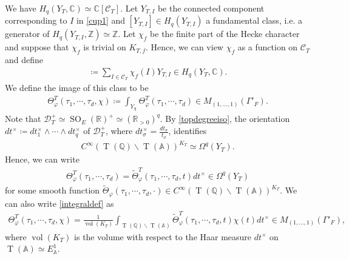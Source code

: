 \documentclass[11pt]{article} %
\newcommand{\8}{\infty}
\newcommand{\Z}{\mathbb{Z}}
\newcommand{\Tbf}{\operatorname{T}}
\newcommand{\SO}{\operatorname{SO}}
\newcommand{\D}{\mathcal{D}}
\newcommand{\R}{\mathbb{R}}
\newcommand{\A}{\mathbb{A}}
\newcommand{\Q}{\mathbb{Q}}
\newcommand{\C}{\mathbb{C}}
\newcommand{\vol}{\operatorname{vol}}
\newcommand{\Ccal}{\mathcal{C}}
\newcommand{\fin}{f}
\newcommand{\thetil}{\widetilde{\Theta}}
\theoremstyle{mytheoremstyle}
\theoremstyle{remark}
\numberwithin{equation}{section}
\begin{document}
We have $H_{q}(Y_T,\C)\simeq \C[\Ccal_T]$. Let $Y_{T,I}$ be the connected component corresponding to $I$ in \eqref{cup1} and $[Y_{T,I}] \in H_{q}(Y_{T,I})$ a fundamental class, {i.e.} a generator of $H_{q}(Y_{T,I},\Z) \simeq \Z$. Let $\chi_\fin$ be the finite part of the Hecke character and suppose that $\chi_\fin$ is trivial on $K_{T,\fin}$. Hence, we can view $\chi_\fin$ as a function on $\Ccal_T$ and define
\begin{align}
    [Y_\chi] \coloneqq \sum_{I \in \Ccal_T} \chi_\fin(I)Y_{T,I} \in H_{q}(Y_T,\C).
\end{align}
We define the image of this class to be
\begin{align} \label{integraldef}
    \Theta^T_{\varphi}(\tau_1, \cdots, \tau_{d},\chi) \coloneqq \int_{Y_\chi} \Theta^T_{\varphi}(\tau_1, \cdots, \tau_{d}) \in M_{(1,\dots,1)}( \Gamma'_F).
\end{align}
 Note that $\D_T^+ \simeq \SO_E(\R)^+ \simeq (\R_{>0})^{q}$. By \eqref{topdegreeiso}, the orientation $dt^\times \coloneqq dt_1^\times \wedge \cdots \wedge dt_{q}^\times$ of $\D_T^+$, where $dt_\sigma^\times=\frac{dt_\sigma}{t_\sigma}$, identifies
\begin{align}
    C^\8 \left ( \Tbf(\Q) \backslash \Tbf(\A) \right )^{K_T} \simeq \Omega^{q}(Y_T).
\end{align} Hence, we can write
\begin{align} \label{lift2}
    \Theta^T_{\varphi}(\tau_1, \cdots, \tau_{d})= \thetil^T_\varphi(\tau_1, \cdots, \tau_d,t)dt^\times \in \Omega^{q}(Y_T)
\end{align}
for some smooth function $\thetil_{\varphi}(\tau_1, \cdots, \tau_d, \cdot ) \in C^\8(\Tbf(\Q) \backslash \Tbf(\A))^{K_T}$. We can also write \eqref{integraldef} as
\begin{align}
    \Theta^T_{\varphi}(\tau_1, \cdots, \tau_{d},\chi) = \frac{1}{\vol(K_{T})}\int_{\Tbf(\Q) \backslash \Tbf(\A)} \thetil^T_\varphi(\tau_1, \cdots, \tau_{d}, t ) \chi(t) dt^\times \in M_{(1,\dots,1)}( \Gamma'_F),
\end{align}
where $\vol(K_{T})$ is the volume with respect to the Haar measure $dt^\times$ on $\Tbf(\A) \simeq E^1_\A$.
\end{document}
